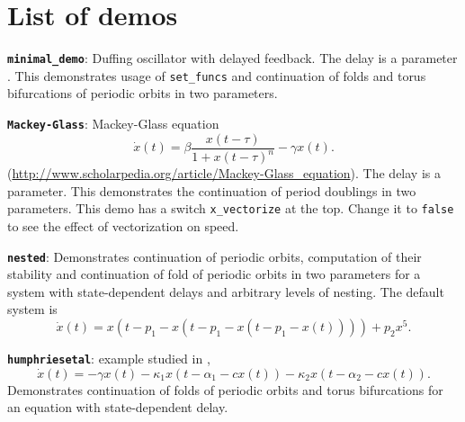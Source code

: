 \documentclass[11pt]{scrartcl}
\newcommand{\blist}[1]{\mbox{\lstinline!#1!}}  \newlength{\tabw}
\begin{document}
\section{List of demos}\label{sec:demos}
\begin{compactitem}
\item \textbf{\texttt{minimal\_demo}}: Duffing oscillator with delayed
  feedback. The delay is a parameter \cite{YP09}. This demonstrates
  usage of \blist{set_funcs} and continuation of folds and torus
  bifurcations of periodic orbits in two parameters.
\item \textbf{\texttt{Mackey-Glass}}: Mackey-Glass equation
  \begin{displaymath}
    \dot x(t)=\beta
  \frac{x(t-\tau)}{1+x(t-\tau)^n}-\gamma x(t)\mbox{.}
\end{displaymath}
(\url{http://www.scholarpedia.org/article/Mackey-Glass_equation}). The
delay is a parameter. This demonstrates the continuation of period
doublings in two parameters. This demo has a switch
\blist{x_vectorize} at the top. Change it to \blist{false} to see the
effect of vectorization on speed.
\item \textbf{\texttt{nested}}: Demonstrates continuation of periodic
  orbits, computation of their stability and continuation of fold of
  periodic orbits in two parameters for a system with state-dependent delays and arbitrary levels of nesting. The default system is
  \begin{displaymath}
    \dot x(t)=x(t-p_1-x(t-p_1-x(t-p_1-x(t))))+p_2x^5\mbox{.}
  \end{displaymath}
\item \textbf{\texttt{humphriesetal}}: example studied in \cite{HDMU12},
  \begin{displaymath}
    \dot x(t)=-\gamma x(t)-\kappa_1x(t-\alpha_1-cx(t))-
    \kappa_2x(t-\alpha_2-cx(t))\mbox{.}
  \end{displaymath}
  Demonstrates continuation of folds of periodic orbits and torus
  bifurcations for an equation with state-dependent delay.
\end{compactitem}
\end{document}
